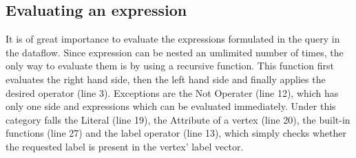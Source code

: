 \documentclass[11pt,singlecolumn]{scrartcl}
\begin{document}
\subsection{Evaluating an expression}
It is of great importance to evaluate the expressions formulated in the query in the dataflow. Since expression can be nested an umlimited number of times, the only way to evaluate them is by using a recursive function. This function first evaluates the right hand side, then the left hand side and finally applies the desired operator (line 3). Exceptions are the Not Operater (line 12), which has only one side and expressions which can be evaluated immediately. Under this category falls the Literal (line 19), the Attribute of a vertex (line 20), the built-in functions (line 27) and the label operator (line 13), which simply checks whether the requested label is present in the vertex' label vector.\\\\
\end{document}
